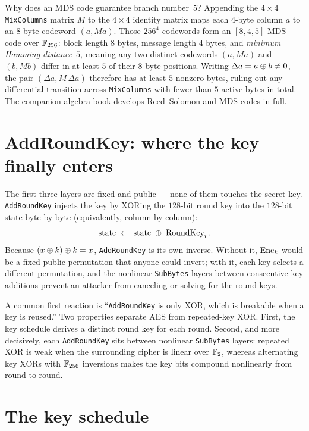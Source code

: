 \begin{connectionbox}
Why does an MDS code guarantee branch number~$5$? Appending the $4\times 4$
\texttt{MixColumns} matrix $M$ to the $4\times 4$ identity matrix maps each
$4$-byte column $a$ to an $8$-byte codeword $(a, Ma)$. Those $256^4$ codewords
form an $[8,4,5]$ MDS code over $\mathbb{F}_{256}$: block length $8$ bytes, message length
$4$ bytes, and \emph{minimum Hamming distance}~$5$, meaning any two distinct
codewords $(a, Ma)$ and $(b, Mb)$ differ in at least $5$ of their $8$ byte
positions. Writing $\Delta a = a \oplus b \neq 0$, the pair $(\Delta a, M\,\Delta a)$
therefore has at least $5$ nonzero bytes, ruling out any differential transition
across \texttt{MixColumns} with fewer than $5$ active bytes in total. The
companion algebra book develops Reed--Solomon and MDS codes in full.
\end{connectionbox}

\section{AddRoundKey: where the key finally enters}
\label{ch12:addroundkey}

The first three layers are fixed and public --- none of them touches the secret
key. \texttt{AddRoundKey} injects the key by XORing the $128$-bit round key into
the $128$-bit state byte by byte (equivalently, column by column):
\[
\text{state} \;\gets\; \text{state} \;\oplus\; \text{RoundKey}_r.
\]
Because $(x \oplus k) \oplus k = x$, \texttt{AddRoundKey} is its own inverse. Without
it, $\operatorname{Enc}_k$ would be a fixed public permutation that anyone could invert; with
it, each key selects a different permutation, and the nonlinear \texttt{SubBytes}
layers between consecutive key additions prevent an attacker from canceling or
solving for the round keys.

\begin{trapbox}
A common first reaction is ``\texttt{AddRoundKey} is only XOR, which is breakable
when a key is reused.'' Two properties separate AES from repeated-key XOR. First,
the key schedule derives a distinct round key for each round. Second, and more
decisively, each \texttt{AddRoundKey} sits between nonlinear \texttt{SubBytes}
layers: repeated XOR is weak when the surrounding cipher is linear over $\mathbb{F}_2$,
whereas alternating key XORs with $\mathbb{F}_{256}$ inversions makes the key bits
compound nonlinearly from round to round.
\end{trapbox}

\section{The key schedule}
\label{ch12:keyschedule}

